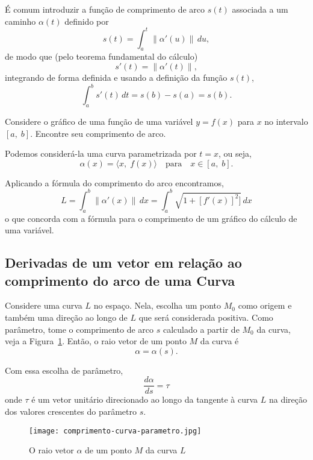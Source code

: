 \bigskip
É comum introduzir a função de comprimento de arco \(s(t)\) associada a um caminho \(\alpha(t)\) definido por
\begin{equation*}
s(t) =\int_{a}^{t} \|\alpha'(u)\|\, du,
\end{equation*}
de modo que (pelo teorema fundamental do cálculo)
\begin{equation*}
s'(t) = \|\alpha'(t)\|,
\end{equation*}
integrando de forma definida e usando a definição da função $s(t)$,
\begin{equation*}
  \int_{a}^{b}s'(t)\,dt=s(b)-s(a) = s(b).
\end{equation*}

\begin{exc}
Considere o gráfico de uma função de uma variável \(y = f (x) \) para \(x\) no intervalo \([a, \;  b]\).  Encontre  seu comprimento de arco.
\end{exc}

\solo
Podemos considerá-la uma curva parametrizada por \(t = x\), ou seja,
\begin{equation*}
\alpha (x) = \langle x, \; f (x)\rangle \quad \text{para} \quad  x \in  [a,\;  b].
\end{equation*}

Aplicando a fórmula  do comprimento do arco  encontramos,
\begin{equation*}
 L= \int_{a}^{b}\|\alpha'(x)\|\, dx =\int_{a}^{b}\sqrt{1 +[f'(x)]^{2}]}\, dx
\end{equation*}
o que concorda com a fórmula para o comprimento de um gráfico do cálculo de uma variável.


\subsection{Derivadas de um vetor em relação ao comprimento do arco de uma Curva}
Considere uma curva \(L\) no espaço. Nela, escolha um ponto \(M_{0}\) como origem e também uma 
direção ao longo de \(L\) que será considerada positiva. Como parâmetro, tome o comprimento de 
arco \(s\) calculado a partir de \(M_{0}\) da curva, veja a Figura~\ref{fig:3-2-9}. Então, o raio  vetor  de um ponto 
\(M\) da curva é
\begin{equation*}
\alpha= \alpha(s).
\end{equation*}

Com essa escolha de parâmetro,
\begin{equation*}
\dfrac{d\alpha}{ds}=\tau
\end{equation*}
onde \(\tau\) é um vetor unitário direcionado ao longo da tangente à curva \(L\) na direção dos valores crescentes do parâmetro \(s\).
\begin{figure}[H]
\centering
\texttt{[image: comprimento-curva-parametro.jpg]}
\caption{O raio vetor \(\alpha\) de um ponto \(M\) da curva \(L\)}
\label{fig:3-2-9}
\end{figure}


